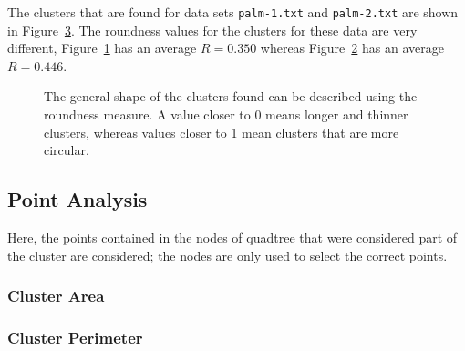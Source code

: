 The clusters that are found for data sets \texttt{palm-1.txt} and
\texttt{palm-2.txt} are shown in Figure~\ref{fig:roundness}. The roundness
values for the clusters for these data are very different,
Figure~\ref{fig:roundness-long.png} has an average $R=0.350$ whereas
Figure~\ref{fig:roundness-round.png} has an average $R=0.446$.

\begin{figure}[tbhp]
	\centering
	\begin{subfigure}[b]{4.2cm}
		\caption{}\label{fig:roundness-long.png}
	\end{subfigure}%
	\quad
	\begin{subfigure}[b]{4.2cm}
		\caption{}\label{fig:roundness-round.png}
	\end{subfigure}
	\caption{The general shape of the clusters found can be described using the
		roundness measure. A value closer to 0 means longer and thinner
		clusters, whereas values closer to 1 mean clusters that are more
		circular.}\label{fig:roundness}
\end{figure}

\subsection{Point Analysis}
\label{sub:point_analysis}

Here, the points contained in the nodes of quadtree that were considered part
of the cluster are considered; the nodes are only used to select the correct
points.

\subsubsection{Cluster Area}
\label{ssub:cluster_area}


\subsubsection{Cluster Perimeter}
\label{ssub:cluster_perimeter}


\cite{lee2002polygonization}

\cite{estivill2000autoclust}

\cite{xia2006border}

\cite{lee1980two}
